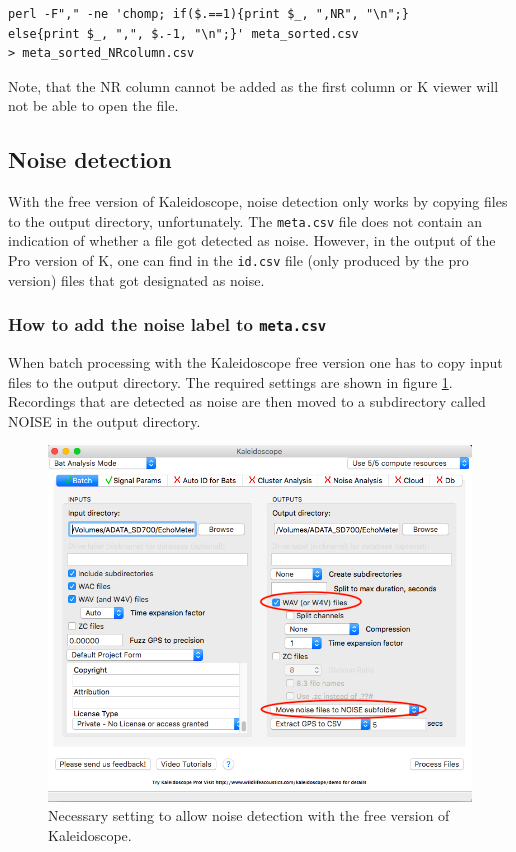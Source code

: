 \documentclass[English, 11pt, twoside, authoryear]{article}
\begin{document}
\begin{lstlisting}
perl -F"," -ne 'chomp; if($.==1){print $_, ",NR", "\n";}
else{print $_, ",", $.-1, "\n";}' meta_sorted.csv 
> meta_sorted_NRcolumn.csv
\end{lstlisting}

Note, that the NR column cannot be added as the first column or \textsf{K} viewer will not be able to open the file.

%
%
%
\subsection{Noise detection}
%
%
%

With the free version of Kaleidoscope, noise detection only works by copying files to the output directory, unfortunately. The \texttt{meta.csv} file does not contain an indication of whether a file got detected as noise. However, in the output of the Pro version of \textsf{K}, one can find in the \texttt{id.csv} file (only produced by the pro version) files that got designated as noise.

%
%
%
\subsubsection{How to add the noise label to \texttt{meta.csv}}
\label{section:noise-detection}
%
%
%
When batch processing with the Kaleidoscope free version one has to copy input files to the output directory. The required settings are shown in figure \ref{Batch_proc_for_noise_detection}. Recordings that are detected as noise are then moved to a subdirectory called NOISE in the output directory.

\begin{figure}[htbp]
\begin{center}
\includegraphics[width=.7\textwidth]{Fig/Batch_proc_for_noise_detection}
\caption{Necessary setting to allow noise detection with the free version of Kaleidoscope.}
\label{Batch_proc_for_noise_detection}
\end{center}
\end{figure}
\end{document}
